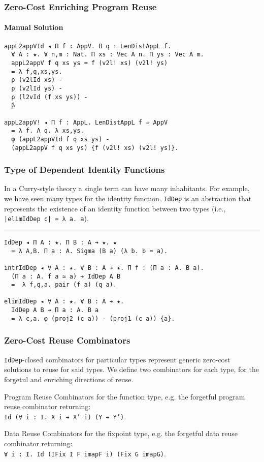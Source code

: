 \documentclass[mathserif,usenames,dvipsnames]{beamer}
\begin{document}
\begin{frame}[fragile]
\frametitle{Zero-Cost Enriching Program Reuse}
\framesubtitle{Manual Solution}

\begin{verbatim}
appL2appVId ◂ Π f : AppV. Π q : LenDistAppL f.
  ∀ A : ★. ∀ n,m : Nat. Π xs : Vec A n. Π ys : Vec A m.
  appL2appV f q xs ys ≃ f (v2l! xs) (v2l! ys)
  = λ f,q,xs,ys.      
  ρ (v2lId xs) -      
  ρ (v2lId ys) -      
  ρ (l2vId (f xs ys)) -
  β

appL2appV! ◂ Π f : AppL. LenDistAppL f ➾ AppV
  = λ f. Λ q. λ xs,ys. 
  φ (appL2appVId f q xs ys) - 
  (appL2appV f q xs ys) {f (v2l! xs) (v2l! ys)}.
\end{verbatim}

\end{frame}

\begin{frame}[fragile]
\frametitle{Type of Dependent Identity Functions}

In a Curry-style theory a single term can have many inhabitants. For
example, we have seen many types for the identity function.
\texttt{IdDep} is an abstraction that represents
the existence of an identity function between two types
(i.e., \texttt{|elimIdDep c| = λ a. a}).

\noindent\rule{\textwidth}{1pt}

\begin{verbatim}
IdDep ◂ Π A : ★. Π B : A ➔ ★. ★
  = λ A,B. Π a : A. Sigma (B a) (λ b. b ≃ a).

intrIdDep ◂ ∀ A : ★. ∀ B : A ➔ ★. Π f : (Π a : A. B a). 
  (Π a : A. f a ≃ a) ➔ IdDep A B 
  =  λ f,q,a. pair (f a) (q a).

elimIdDep ◂ ∀ A : ★. ∀ B : A ➔ ★. 
  IdDep A B ➔ Π a : A. B a
  = λ c,a. φ (proj2 (c a)) - (proj1 (c a)) {a}.
\end{verbatim}

\end{frame}

\begin{frame}[fragile]
\frametitle{Zero-Cost Reuse Combinators}

\texttt{IdDep}-closed combinators for particular types represent
generic zero-cost solutions to reuse for said types. We define two
combinators for each type, for the forgetul and enriching directions
of reuse.

\begin{block}{Program Reuse}
Combinators for the function type, e.g. the forgetful program reuse
combinator returning:\\
\texttt{Id (∀ i : I. X i ➔ X' i) (Y ➔ Y')}.
\end{block}

\begin{block}{Data Reuse}
Combinators for the fixpoint type, e.g. the forgetful data reuse
combinator returning:\\
\texttt{∀ i : I. Id (IFix I F imapF i) (Fix G imapG)}.
\end{block}

\end{frame}
\end{document}
